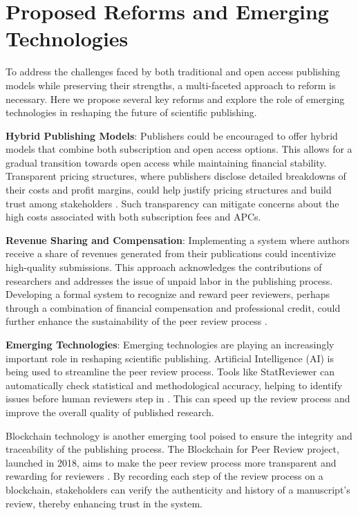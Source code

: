 \documentclass{article}
\begin{document}
\section{Proposed Reforms and Emerging Technologies}\label{sec:Reform}
To address the challenges faced by both traditional and open access publishing models while preserving their strengths, a multi-faceted approach to reform is necessary. Here we propose several key reforms and explore the role of emerging technologies in reshaping the future of scientific publishing.

\textbf{Hybrid Publishing Models}: 
Publishers could be encouraged to offer hybrid models that combine both subscription and open access options. This allows for a gradual transition towards open access while maintaining financial stability. Transparent pricing structures, where publishers disclose detailed breakdowns of their costs and profit margins, could help justify pricing structures and build trust among stakeholders \cite{bjork2017scholarly}. Such transparency can mitigate concerns about the high costs associated with both subscription fees and APCs.

\textbf{Revenue Sharing and Compensation}: 
Implementing a system where authors receive a share of revenues generated from their publications could incentivize high-quality submissions. This approach acknowledges the contributions of researchers and addresses the issue of unpaid labor in the publishing process. Developing a formal system to recognize and reward peer reviewers, perhaps through a combination of financial compensation and professional credit, could further enhance the sustainability of the peer review process \cite{publons2018global}.

\textbf{Emerging Technologies}: 
Emerging technologies are playing an increasingly important role in reshaping scientific publishing. Artificial Intelligence (AI) is being used to streamline the peer review process. Tools like StatReviewer can automatically check statistical and methodological accuracy, helping to identify issues before human reviewers step in \cite{heaven2018ai}. This can speed up the review process and improve the overall quality of published research.

Blockchain technology is another emerging tool poised to ensure the integrity and traceability of the publishing process. The Blockchain for Peer Review project, launched in 2018, aims to make the peer review process more transparent and rewarding for reviewers \cite{van2017blockchain, lawton2021peer}. By recording each step of the review process on a blockchain, stakeholders can verify the authenticity and history of a manuscript’s review, thereby enhancing trust in the system.
\end{document}
